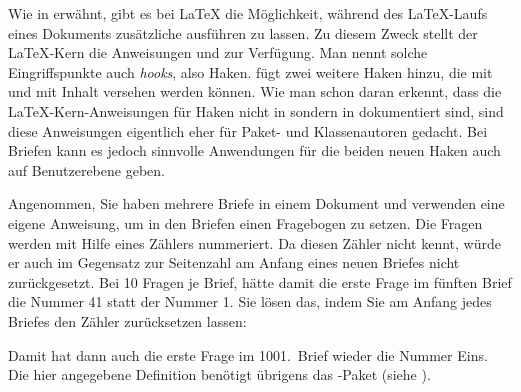 \else%
  Wie in \cite{latex:clsguide} erwähnt, gibt es bei
  \LaTeX{} die Möglichkeit, während des \LaTeX-Laufs eines Dokuments zusätzliche
   ausführen zu lassen. Zu diesem Zweck stellt der
  \LaTeX-Kern die Anweisungen  und
   zur Verfügung. Man nennt
  solche Eingriffspunkte auch \emph{hooks}, also
  Haken. \KOMAScript{} fügt zwei weitere Haken hinzu, die mit
   und
   mit Inhalt versehen
  werden können. Wie man schon daran erkennt, dass die \LaTeX-Kern-Anweisungen
  für Haken nicht in \cite{latex:usrguide} sondern in \cite{latex:clsguide}
  dokumentiert sind, sind diese Anweisungen eigentlich eher für Paket- und
  Klassenautoren gedacht. Bei Briefen kann es jedoch sinnvolle Anwendungen für
  die beiden neuen Haken auch auf Benutzerebene geben.%
  \begin{Example}
    Angenommen, Sie haben mehrere Briefe in einem Dokument und verwenden
    eine eigene Anweisung, um in den Briefen einen Fragebogen
    zu setzen. Die Fragen werden mit Hilfe eines
    Zählers nummeriert. Da \KOMAScript{} diesen Zähler nicht kennt,
    würde er auch im Gegensatz zur Seitenzahl am Anfang eines
    neuen Briefes nicht zurückgesetzt. Bei 10 Fragen je Brief, hätte damit die
    erste Frage im fünften Brief die Nummer 41 statt der Nummer 1. Sie lösen
    das, indem Sie am Anfang jedes Briefes den Zähler zurücksetzen lassen:
\begin{lstcode}
  \newcommand{\Frage}[1]{%
    \refstepcounter{Frage}\par
    \noindent\begin{tabularx}{\textwidth}{l@{}X}
      \theFrage:~ & #1\\
    \end{tabularx}%
  }%
  \AtBeginLetter{\setcounter{Frage}{0}}
\end{lstcode}
    Damit hat dann auch die erste Frage im 1001.~Brief wieder die Nummer
    Eins. Die hier angegebene Definition benötigt übrigens das
    -Paket (siehe
    \cite{package:tabularx}).
  \end{Example}%
\fi
%
\EndIndexGroup
\ExampleEndFix%


